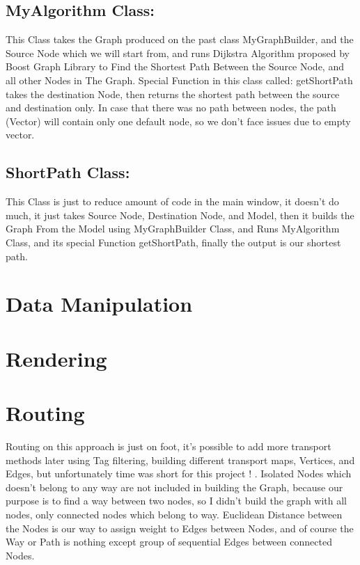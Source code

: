 \documentclass[a4paper,english]{book}
\begin{document}
\subsection{ MyAlgorithm Class:}
This Class takes the Graph produced on the past class MyGraphBuilder, and the Source Node which we will start from, and runs Dijkstra Algorithm proposed by Boost Graph Library to Find the Shortest Path Between the Source Node, and all other Nodes in The Graph.
Special Function in this class called: getShortPath takes the destination Node, then returns the shortest path between the source and destination only.
In case that there was no path between nodes, the path (Vector) will contain only one default node, so we don’t face issues due to empty vector.
\subsection{ ShortPath Class:}
This Class is just to reduce amount of code in the main window, it doesn’t do much, it just takes Source Node, Destination Node, and Model, then it builds the Graph From the Model using MyGraphBuilder Class, and Runs MyAlgorithm Class, and its special Function getShortPath, finally the output is our shortest path.

\section{Data Manipulation}

\section{Rendering}

\section{Routing}
Routing on this approach is just on foot, it’s possible to add more transport methods later using Tag filtering, building different transport maps, Vertices, and Edges, but unfortunately time was short for this project ! .
Isolated Nodes which doesn’t belong to any way are not included in building the Graph, because our purpose is to find a way between two nodes, so I didn’t build the graph with all nodes, only connected nodes which belong to way.
Euclidean Distance between the Nodes is our way to assign weight to Edges between Nodes, and of course the Way or Path is nothing except group of sequential Edges between connected Nodes.
\end{document}
